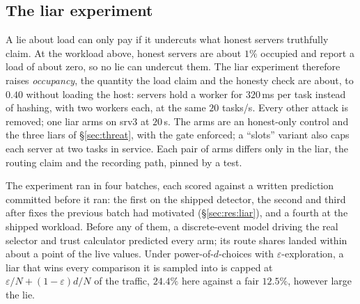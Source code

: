 \documentclass[10pt,twocolumn,letterpaper]{article}
\begin{document}
\subsection{The liar experiment}
\label{sec:method:liar}
A lie about load can only pay if it undercuts what honest servers truthfully
claim. At the workload above, honest servers are about $1\%$ occupied and
report a load of about zero, so no lie can undercut them. The liar experiment
therefore raises \emph{occupancy}, the quantity the load claim and the
honesty check are about, to $0.40$ without loading the host: servers hold a
worker for $320$\,ms per task instead of hashing, with two workers each, at
the same $20$ tasks/s. Every other attack is removed; one liar arms on srv3 at
$20$\,s. The arms are an honest-only control and the three liars of
\S\ref{sec:threat}, with the gate enforced; a ``slots'' variant also caps
each server at two tasks in service. Each pair of arms differs only in the
liar, the routing claim and the recording path, pinned by a test.

The experiment ran in four batches, each scored against a written prediction
committed before it ran: the first on the shipped detector, the second and
third after fixes the previous batch had motivated (\S\ref{sec:res:liar}),
and a fourth at the shipped workload. Before any of them, a discrete-event
model driving the real selector and trust calculator predicted every arm; its
route shares landed within about a point of the live values. Under
power-of-$d$-choices with $\varepsilon$-exploration, a liar that wins every
comparison it is sampled into is capped at $\varepsilon/N + (1-\varepsilon)d/N$
of the traffic, $24.4\%$ here against a fair $12.5\%$, however large the lie.
\end{document}
